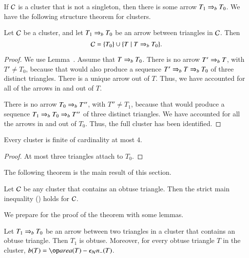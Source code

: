If $\mathcal C$ is a cluster that is not a singleton, then there is
some arrow $T_1\Rightarrow_{b} T_0$.  We have the following structure
theorem for clusters.

\begin{theorem}
  Let $\mathcal C$ be a cluster, and let $T_1\Rightarrow_{b} T_0$ be an
  arrow between triangles in $\mathcal C$.
  Then 
  \begin{equation}\libel{eqn:c-weak}
  \C = \{T_0\}\cup \{T \mid T\rab T_0\}.
  \end{equation}
\end{theorem}

\begin{proof}  
  We use Lemma~.  Assume that $T\Rightarrow_{b} T_0$.  There
  is no arrow $T'\Rightarrow_{b} T$, with $T'\ne T_0$, because that would also
  produce a sequence $T' \Rightarrow_{b} T \Rightarrow_{b} T_0$ of three distinct triangles.
  There is a unique arrow out of $T$.  Thus, we have accounted for all
  of the arrows in and out of $T$.

  There is no arrow $T_0\Rightarrow_{b} T''$, with $T''\ne T_1$, because that
  would produce a sequence $T_1\Rightarrow_{b} T_0\Rightarrow_{b} T''$ of  three 
  distinct triangles.  We have accounted for all the arrows in and
  out of $T_0$.  Thus, the full cluster has been identified.
\end{proof}

\begin{corollary}
  Every cluster is finite of cardinality at most $4$.
\end{corollary}

\begin{proof} At most three triangles attach to $T_0$.
\end{proof}

The following theorem is the main result of this
section.

\begin{theorem}  
  Let $\mathcal C$ be any cluster that contains an obtuse triangle.  Then 
   the strict main inequality ()
  holds for $\mathcal C$.
\end{theorem}

We prepare for the proof of the theorem with some lemmas.

\begin{lemma}  
  Let $T_1\Rightarrow_{b} T_0$ be an
  arrow between two triangles in a cluster that contains an obtuse
  triangle.  Then $T_1$ is obtuse.  Moreover, for every obtuse
  triangle $T$ in the cluster, $b(T) = \area(T) -\epsN n_-(T)$.
\end{lemma}

